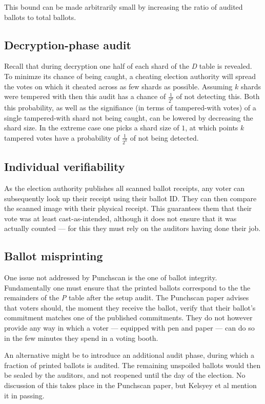 This bound can be made arbitrarily small by increasing the ratio of audited
ballots to total ballots.

\subsection{Decryption-phase audit}

Recall that during decryption one half of each shard of the \emph{D} table is
revealed. To minimze its chance of being caught, a cheating election authority
will spread the votes on which it cheated across as few shards as possible.
Assuming $k$ shards were tempered with then this audit has a chance of
$\frac{1}{2^k}$ of not detecting this. Both this probability, as well as the
signifiance (in terms of tampered-with votes) of a single tampered-with shard
not being caught, can be lowered by decreasing the shard size. In the extreme
case one picks a shard size of $1$, at which points $k$ tampered votes have a
probability of $\frac{1}{2^k}$ of not being detected.

\subsection{Individual verifiability}

As the election authority publishes all scanned ballot receipts, any voter can
subsequently look up their receipt using their ballot ID. They can then compare
the scanned image with their physical receipt. This guarantees them that their
vote was at least cast-as-intended, although it does not ensure that it was
actually counted --- for this they must rely on the auditors having done their
job.

\subsection{Ballot misprinting}

One issue not addressed by Punchscan is the one of ballot integrity.
Fundamentally one must ensure that the printed ballots correspond to the the
remainders of the \emph{P} table after the setup audit. The Punchscan paper
advises that voters should, the moment they receive the ballot, verify that
their ballot's commitment matches one of the published commitments. They do not
however provide any way in which a voter --- equipped with pen and paper ---
can do so in the few minutes they spend in a voting booth.

An alternative might be to introduce an additional audit phase, during which a
fraction of printed ballots is audited. The remaining unspoiled ballots would
then be sealed by the auditors, and not reopened until the day of the election.
No discussion of this takes place in the Punchscan paper, but Kelsyey et
al\autocite{kelseyAttackingPaperBasedE2E2010} mention it in passing.


